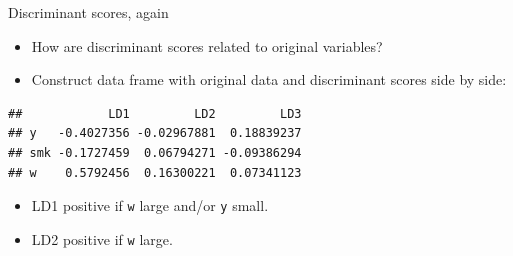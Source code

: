 \documentclass[
  ignorenonframetext,
]{beamer}
\newenvironment{Shaded}{\begin{snugshade}}{\end{snugshade}}
\newcommand{\DecValTok}[1]{\textcolor[rgb]{0.00,0.00,0.81}{#1}}
\newcommand{\FloatTok}[1]{\textcolor[rgb]{0.00,0.00,0.81}{#1}}
\newcommand{\KeywordTok}[1]{\textcolor[rgb]{0.13,0.29,0.53}{\textbf{#1}}}
\newcommand{\NormalTok}[1]{#1}
\newcommand{\OperatorTok}[1]{\textcolor[rgb]{0.81,0.36,0.00}{\textbf{#1}}}
\newcommand{\StringTok}[1]{\textcolor[rgb]{0.31,0.60,0.02}{#1}}
\begin{document}
\begin{frame}[fragile]{Discriminant scores, again}
\protect\hypertarget{discriminant-scores-again}{}

\begin{itemize}
\item
  How are discriminant scores related to original variables?
\item
  Construct data frame with original data and discriminant scores side
  by side:
\end{itemize}

\footnotesize

\begin{Shaded}
\end{Shaded}

\begin{verbatim}
##            LD1         LD2         LD3
## y   -0.4027356 -0.02967881  0.18839237
## smk -0.1727459  0.06794271 -0.09386294
## w    0.5792456  0.16300221  0.07341123
\end{verbatim}

\begin{Shaded}
\end{Shaded}

\normalsize

\begin{itemize}
\item
  LD1 positive if \texttt{w} large and/or \texttt{y} small.
\item
  LD2 positive if \texttt{w} large.
\end{itemize}

\end{frame}
\end{document}
